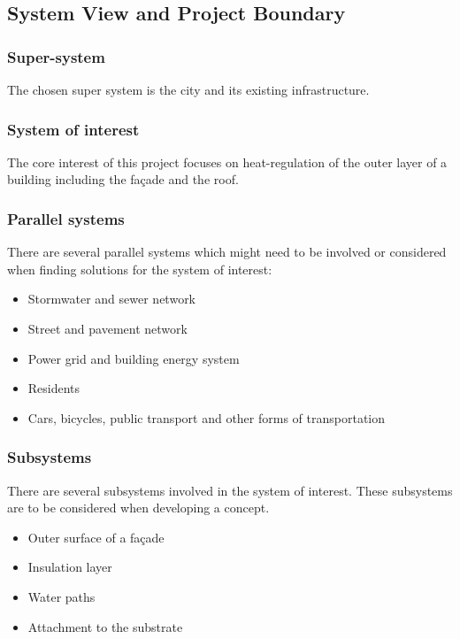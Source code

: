 \clearpage

\subsection{System View and Project Boundary}
\label{sec:systemview}

\subsubsection{Super-system}
The chosen super system is the city and its existing infrastructure.

\subsubsection{System of interest}
The core interest of this project focuses on heat-regulation of the outer layer of a
building including the façade and the roof.

\subsubsection{Parallel systems}
There are several parallel systems which might need to be involved or considered when
finding solutions for the system of interest:
\begin{itemize}
  \item Stormwater and sewer network
  \item Street and pavement network
  \item Power grid and building energy system
  \item Residents
  \item Cars, bicycles, public transport and other forms of transportation
\end{itemize}

\subsubsection{Subsystems}
There are several subsystems involved in the system of interest. These subsystems are to
be considered when developing a concept.
\begin{itemize}
  \item Outer surface of a façade
  \item Insulation layer
  \item Water paths
  \item Attachment to the substrate
\end{itemize}

